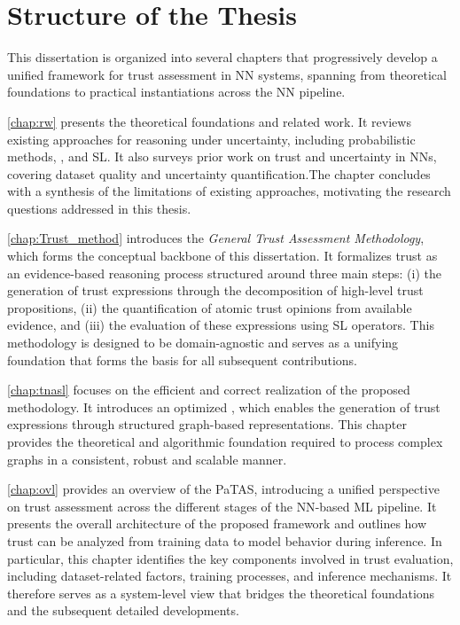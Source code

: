 \section{Structure of the Thesis}

This dissertation is organized into several chapters that progressively develop a unified framework for trust assessment in \ac{NN} systems, spanning from theoretical foundations to practical instantiations across the \ac{NN} pipeline.

\cref{chap:rw} presents the theoretical foundations and related work. It reviews existing approaches for reasoning under uncertainty, including probabilistic methods, , and \ac{SL}. It also surveys prior work on trust and uncertainty in \acp{NN}, covering dataset quality and uncertainty quantification.The chapter concludes with a synthesis of the limitations of existing approaches, motivating the research questions addressed in this thesis.

\cref{chap:Trust_method} introduces the \emph{General Trust Assessment Methodology}, which forms the conceptual backbone of this dissertation. It formalizes trust as an evidence-based reasoning process structured around three main steps: (i) the generation of trust expressions through the decomposition of high-level trust propositions, (ii) the quantification of atomic trust opinions from available evidence, and (iii) the evaluation of these expressions using \ac{SL} operators. This methodology is designed to be domain-agnostic and serves as a unifying foundation that forms the basis for all subsequent contributions.

\cref{chap:tnasl} focuses on the efficient and correct realization of the proposed methodology. It introduces an optimized , which enables the generation of trust expressions through structured graph-based representations. This chapter provides the theoretical and algorithmic foundation required to process complex graphs in a consistent, robust and scalable manner.


\cref{chap:ovl} provides an overview of the \acf{PaTAS}, introducing a unified perspective on trust assessment across the different stages of the \ac{NN}-based \ac{ML} pipeline. It presents the overall architecture of the proposed framework and outlines how trust can be analyzed from training data to model behavior during inference. In particular, this chapter identifies the key components involved in trust evaluation, including dataset-related factors, training processes, and inference mechanisms. It therefore serves as a system-level view that bridges the theoretical foundations and the subsequent detailed developments.




